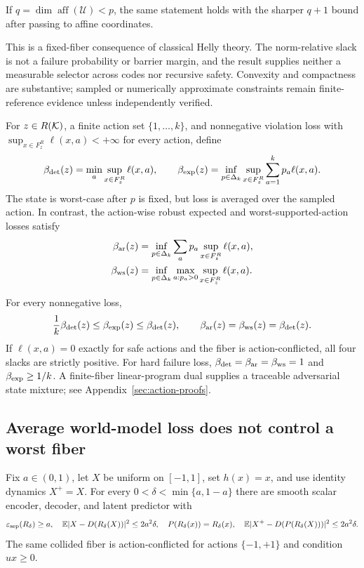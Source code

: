 If $q=\dim\operatorname{aff}(\mathcal U)<p$, the same statement holds with the sharper $q+1$
bound after passing to affine coordinates.

This is a fixed-fiber consequence of classical Helly theory.  The norm-relative slack is not a
failure probability or barrier margin, and the result supplies neither a measurable selector
across codes nor recursive safety.  Convexity and compactness are substantive; sampled or
numerically approximate constraints remain finite-reference evidence unless independently
verified.

For $z\in R(\mathcal{K})$, a finite action set $\{1,\ldots,k\}$, and nonnegative violation loss with
$\sup_{x\in F_z^R}\ell(x,a)<+\infty$ for every action, define
\[
 \beta_{\rm det}(z)=\min_a\sup_{x\in F_z^R}\ell(x,a),\qquad
 \beta_{\rm exp}(z)=\inf_{p\in\Delta_k}\sup_{x\in F_z^R}\sum_{a=1}^kp_a\ell(x,a).
\]
The state is worst-case after $p$ is fixed, but loss is averaged over the sampled action.  In
contrast, the action-wise robust expected and worst-supported-action losses satisfy
\begin{align*}
 \beta_{\rm ar}(z)
 &=\inf_{p\in\Delta_k}\sum_a p_a\sup_{x\in F_z^R}\ell(x,a),\\
 \beta_{\rm ws}(z)
 &=\inf_{p\in\Delta_k}\max_{a:p_a>0}\sup_{x\in F_z^R}\ell(x,a).
\end{align*}

\begin{theorem}\label{thm:finite-action}
For every nonnegative loss,
\begin{equation}
 \frac1k\beta_{\rm det}(z)\leq\beta_{\rm exp}(z)\leq\beta_{\rm det}(z),
 \qquad \beta_{\rm ar}(z)=\beta_{\rm ws}(z)=\beta_{\rm det}(z).
 \label{eq:finite-action-sandwich}
\end{equation}
If $\ell(x,a)=0$ exactly for safe actions and the fiber is action-conflicted, all four slacks are
strictly positive.  For hard failure loss, $\beta_{\rm det}=\beta_{\rm ar}=\beta_{\rm ws}=1$ and
$\beta_{\rm exp}\geq1/k$.  A finite-fiber linear-program dual supplies a traceable adversarial
state mixture; see Appendix~\ref{sec:action-proofs}.
\end{theorem}

\subsection{Average world-model loss does not control a worst fiber}

\begin{proposition}\label{prop:average-separation}
Fix $a\in(0,1)$, let $X$ be uniform on $[-1,1]$, set $h(x)=x$, and use identity dynamics
$X^+=X$.  For every $0<\delta<\min\{a,1-a\}$ there are smooth scalar encoder, decoder, and latent
predictor with
\[
 \varepsilon_{\mathrm{sep}}(R_\delta)\geq a,\quad
 \mathbb E|X-D(R_\delta(X))|^2\leq2a^2\delta,\quad
 P(R_\delta(x))=R_\delta(x),\quad
 \mathbb E|X^+-D(P(R_\delta(X)))|^2\leq2a^2\delta.
\]
The same collided fiber is action-conflicted for actions $\{-1,+1\}$ and condition $ux\geq0$.
\end{proposition}

